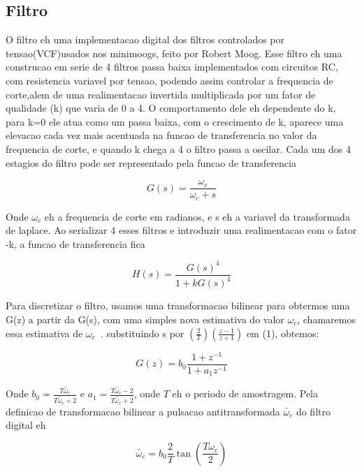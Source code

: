 \documentclass{article}
\begin{document}
\subsection{Filtro}

O filtro eh uma implementacao digital dos filtros controlados por tensao(VCF)usados nos minimoogs, feito por Robert Moog. Esse filtro eh uma construcao em serie de 4 filtros passa baixa implementados com circuitos RC, com resistencia variavel por tensao, podendo assim controlar a frequencia de corte,alem de uma realimentacao invertida multiplicada por um fator de qualidade (k) que varia de 0 a 4.
O comportamento dele eh dependente do k, para k=0 ele atua como um passa baixa, com o crescimento de k, aparece uma elevacao 
cada vez mais acentuada na funcao de transferencia no valor da frequencia de corte, e quando k chega a 4 o filtro passa a oscilar.
Cada um dos 4 estagios do filtro pode ser representado pela funcao de transferencia

\begin{equation}\label{eq:(1)}
G(s) = \frac{\omega_c}{\omega_c+s}  
\end{equation}

Onde $\omega_c$ eh a frequencia de corte em radianos, e s eh a variavel da transformada de laplace.
Ao serializar 4 esses filtros e introduzir uma realimentacao com o fator -k, a funcao de transferencia fica

\begin{equation}\label{eq:(2)}
 H(s) = \frac{G(s)^4}{1+k G(s)^4} 
\end{equation}


Para discretizar o filtro, usamos uma transformacao bilinear para obtermos uma G(z) a partir da G(s), 
com uma simples nova estimativa do valor $\omega_c$, chamaremos essa estimativa de $\omega_c$~.
substituindo s por $(\frac{2}{T})(\frac{z-1}{z+1})$ em (1), obtemos:

\begin{equation}\label{eq:(3)}
G(z) = b_0 \frac{1+z^{-1}}{1+a_1 z^{-1}}  
\end{equation}


Onde $b_0 = \frac{T \tilde{\omega_c}}{T \tilde{\omega_c}+2}$ e $a_1 = \frac{T \tilde{\omega_c} -2}{T\tilde{\omega_c} +2}$, onde $T$ eh o periodo de amostragem.
Pela definicao de transformacao bilinear a pulsacao antitransformada $\tilde{\omega_c}$ do filtro digital eh

\begin{equation}\label{eq:(4)}
\tilde{\omega_c} = b_0 \frac{2}{T} \tan({\frac{T \omega_c}{2}} ) 
\end{equation}
\end{document}
